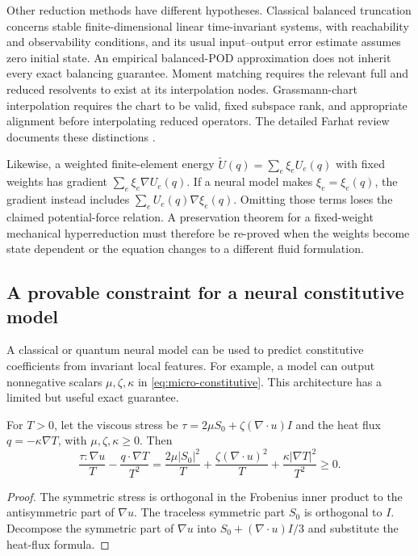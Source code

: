 Other reduction methods have different hypotheses.  Classical balanced
truncation concerns stable finite-dimensional linear time-invariant
systems, with reachability and observability conditions, and its usual
input--output error estimate assumes zero initial state.  An empirical
balanced-POD approximation does not inherit every exact balancing
guarantee.  Moment matching requires the relevant full and reduced
resolvents to exist at its interpolation nodes.  Grassmann-chart
interpolation requires the chart to be valid, fixed subspace rank,
and appropriate alignment before interpolating reduced operators.
The detailed Farhat review documents these distinctions
\citep{microFarhatCourse}.

Likewise, a weighted finite-element energy
$\widetilde U(q)=\sum_e\xi_e U_e(q)$ with fixed weights has
gradient $\sum_e\xi_e\nabla U_e(q)$.  If a neural model makes
$\xi_e=\xi_e(q)$, the gradient instead includes
$\sum_e U_e(q)\nabla\xi_e(q)$.  Omitting those terms loses the
claimed potential-force relation.  A preservation theorem for a
fixed-weight mechanical hyperreduction must therefore be re-proved
when the weights become state dependent or the equation changes to
a different fluid formulation.

\subsection{A provable constraint for a neural constitutive model}

A classical or quantum neural model can be used to predict constitutive
coefficients from invariant local features.  For example, a model can
output nonnegative scalars $\mu,\zeta,\kappa$ in
\eqref{eq:micro-constitutive}.  This architecture has a limited but
useful exact guarantee.

\begin{proposition}
\label{prop:micro-learned-entropy}
For $T>0$, let the viscous stress be
$\tau=2\mu S_0+\zeta(\nabla\cdot u)I$ and the heat flux
$q=-\kappa\nabla T$, with $\mu,\zeta,\kappa\ge0$.
Then
\[
 \frac{\tau:\nabla u}{T}
       -\frac{q\cdot\nabla T}{T^2}
 =\frac{2\mu|S_0|^2}{T}
  +\frac{\zeta(\nabla\cdot u)^2}{T}
  +\frac{\kappa|\nabla T|^2}{T^2}\ge0.
\]
\end{proposition}
\begin{proof}
The symmetric stress is orthogonal in the Frobenius inner product to
the antisymmetric part of $\nabla u$.  The traceless symmetric
part $S_0$ is orthogonal to $I$.  Decompose the symmetric part of
$\nabla u$ into $S_0+(\nabla\cdot u)I/3$ and substitute the
heat-flux formula.
\end{proof}

